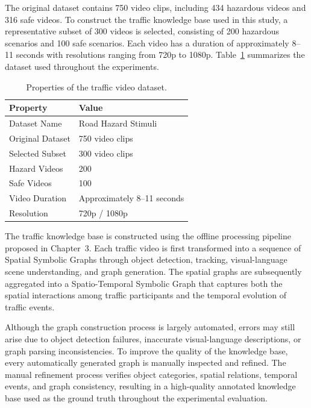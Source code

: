\documentclass[a4paper, 11pt]{article} %
\begin{document}
The original dataset contains 750 video clips, including 434 hazardous videos and 316 safe videos. To construct the traffic knowledge base used in this study, a representative subset of 300 videos is selected, consisting of 200 hazardous scenarios and 100 safe scenarios. Each video has a duration of approximately 8--11 seconds with resolutions ranging from 720p to 1080p. Table~\ref{tab:dataset_properties} summarizes the dataset used throughout the experiments.

\begin{table}[H]
\centering
\renewcommand{\arraystretch}{1.2}
\begin{tabular}{|p{5cm}|p{8cm}|}
\hline
\textbf{Property} & \textbf{Value} \\
\hline
Dataset Name & Road Hazard Stimuli \cite{song2024road} \\
\hline
Original Dataset & 750 video clips \\
\hline
Selected Subset & 300 video clips \\
\hline
Hazard Videos & 200 \\
\hline
Safe Videos & 100 \\
\hline
Video Duration & Approximately 8--11 seconds \\
\hline
Resolution & 720p / 1080p \\
\hline
\end{tabular}
\caption{Properties of the traffic video dataset.}
\label{tab:dataset_properties}
\end{table}

The traffic knowledge base is constructed using the offline processing pipeline proposed in Chapter~3. Each traffic video is first transformed into a sequence of Spatial Symbolic Graphs through object detection, tracking, visual-language scene understanding, and graph generation. The spatial graphs are subsequently aggregated into a Spatio-Temporal Symbolic Graph that captures both the spatial interactions among traffic participants and the temporal evolution of traffic events.

Although the graph construction process is largely automated, errors may still arise due to object detection failures, inaccurate visual-language descriptions, or graph parsing inconsistencies. To improve the quality of the knowledge base, every automatically generated graph is manually inspected and refined. The manual refinement process verifies object categories, spatial relations, temporal events, and graph consistency, resulting in a high-quality annotated knowledge base used as the ground truth throughout the experimental evaluation.
\end{document}
